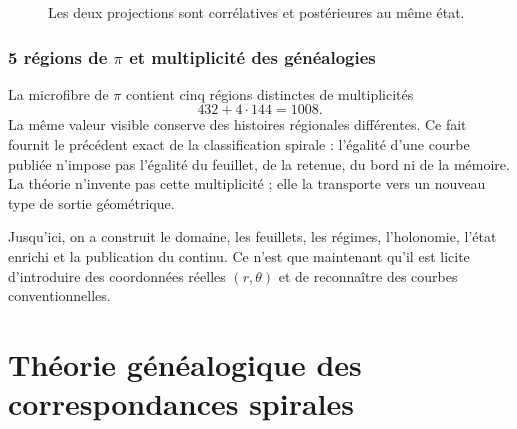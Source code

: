 \begin{figure}[htbp]
\centering
{}
\caption{Les deux projections sont corrélatives et postérieures au même état.}
\label{espiral:fig:doble-proyeccion-espiral}
\end{figure}

\section{5 régions de \texorpdfstring{\(\pi\)}{pi} et multiplicité des généalogies}

La microfibre de \(\pi\) contient cinq régions distinctes de multiplicités
\[
 432+4\cdot144=1008.
\]
La même valeur visible conserve des histoires régionales différentes. Ce fait fournit le précédent exact de la classification spirale : l'égalité d'une courbe publiée n'impose pas l'égalité du feuillet, de la retenue, du bord ni de la mémoire. La théorie n'invente pas cette multiplicité ; elle la transporte vers un nouveau type de sortie géométrique.

\begin{resultbox}[title={Antériorité causale du continu discret par rapport au lecteur radial}]
Jusqu'ici, on a construit le domaine, les feuillets, les régimes, l'holonomie, l'état enrichi et la publication du continu. Ce n'est que maintenant qu'il est licite d'introduire des coordonnées réelles \((r,\theta)\) et de reconnaître des courbes conventionnelles.
\end{resultbox}
\part{Théorie généalogique des correspondances spirales}


